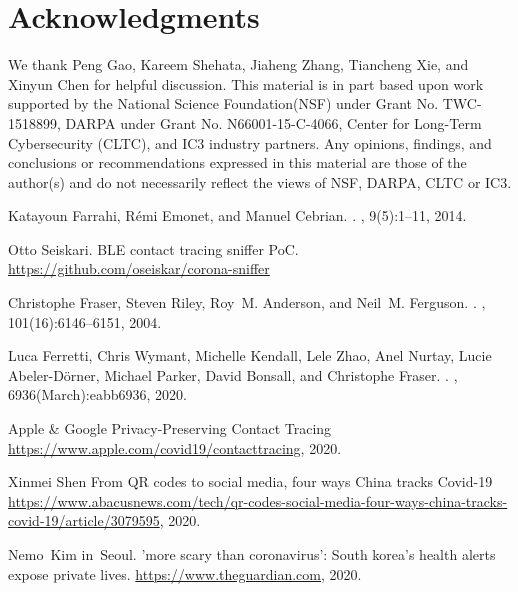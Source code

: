 \section*{Acknowledgments}
We thank Peng Gao, Kareem Shehata, Jiaheng Zhang, Tiancheng Xie, and Xinyun Chen for helpful discussion. This material is in part based upon work supported by the National Science Foundation(NSF) under Grant No. TWC-1518899, DARPA under Grant No. N66001-15-C-4066, Center for Long-Term Cybersecurity (CLTC), and IC3 industry partners. Any opinions, findings, and conclusions or recommendations expressed in this material are those of the author(s) and do not necessarily reflect the views of NSF, DARPA, CLTC or IC3.


\begin{thebibliography}{10}
\itemsep=1pt
\begin{small}

Katayoun Farrahi, R{\'{e}}mi Emonet, and Manuel Cebrian.
.
, 9(5):1--11, 2014.

 Otto Seiskari. \newblock
 BLE contact tracing sniffer PoC. \newblock \url{https://github.com/oseiskar/corona-sniffer} 
 
Christophe Fraser, Steven Riley, Roy~M. Anderson, and Neil~M. Ferguson. 
.
, 101(16):6146--6151, 2004.

Luca Ferretti, Chris Wymant, Michelle Kendall, Lele Zhao, Anel Nurtay, Lucie
  Abeler-D{\"{o}}rner, Michael Parker, David Bonsall, and Christophe Fraser.
.
, 6936(March):eabb6936, 2020.

 Apple \& Google
\newblock Privacy-Preserving Contact Tracing
\newblock \url{https://www.apple.com/covid19/contacttracing}, 2020.

 Xinmei Shen
\newblock From QR codes to social media, four ways China tracks Covid-19
\newblock \url{https://www.abacusnews.com/tech/qr-codes-social-media-four-ways-china-tracks-covid-19/article/3079595}, 2020.

Nemo~Kim in~Seoul.
\newblock 'more scary than coronavirus': South korea's health alerts expose
  private lives.
\newblock
  \url{https://www.theguardian.com},
  2020.


\end{small}
\end{thebibliography}
